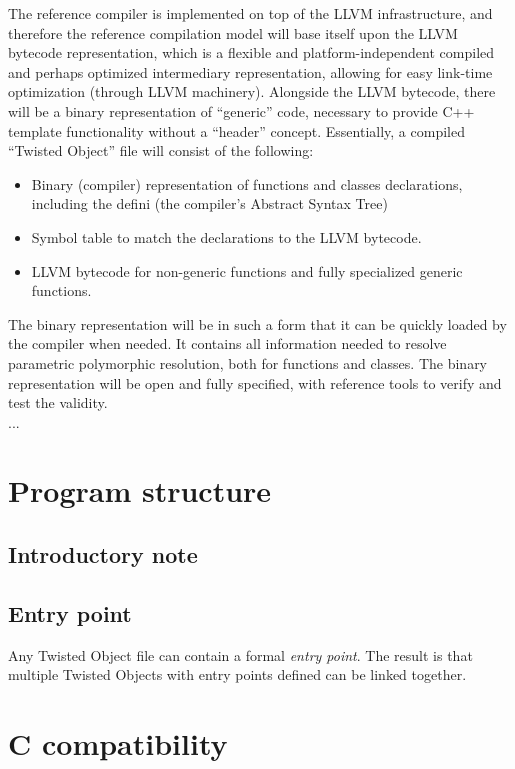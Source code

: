 \documentclass[a4paper,11pt]{article}
\begin{document}
The reference compiler is implemented on top of the LLVM infrastructure, and therefore the reference compilation model will base itself upon the LLVM bytecode representation, which is a flexible and platform-independent compiled and perhaps optimized intermediary representation, allowing for easy link-time optimization (through LLVM machinery).
Alongside the LLVM bytecode, there will be a binary representation of “generic” code, necessary to provide C++ template functionality without a “header” concept.
Essentially, a compiled “Twisted Object” file will consist of the following:
\begin{itemize}
  \item Binary (compiler) representation of functions and classes declarations, including the defini (the compiler’s Abstract Syntax Tree)
  \item Symbol table to match the declarations to the LLVM bytecode.
  \item LLVM bytecode for non-generic functions and fully specialized generic functions.
\end{itemize}
The binary representation will be in such a form that it can be quickly loaded by the compiler when needed.
It contains all information needed to resolve parametric polymorphic resolution, both for functions and classes.
The binary representation will be open and fully specified, with reference tools to verify and test the validity.
\\ ...

\section{Program structure}
  \subsection{Introductory note}


  \subsection{Entry point}

Any Twisted Object file can contain a formal \emph{entry point}.
The result is that multiple Twisted Objects with entry points defined can be linked together. 

\section{C compatibility} \label{sec:c_compatibility}
\end{document}
